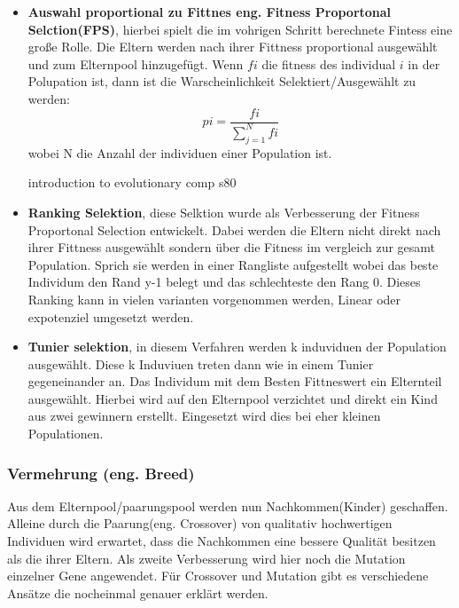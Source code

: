 \begin{itemize}
\item \textbf{Auswahl proportional zu Fittnes eng. Fitness Proportonal Selction(FPS)}, hierbei spielt die im vohrigen Schritt berechnete Fintess eine große Rolle. Die Eltern werden nach ihrer Fittness proportional ausgewählt und zum Elternpool hinzugefügt. Wenn $fi$ die fitness des individual $i$ in der Polupation ist, dann ist die Warscheinlichkeit Selektiert/Ausgewählt zu werden:
\begin{equation}
	pi = \frac{fi}{\sum_{j=1}^N fi}
\end{equation}
wobei N die Anzahl der individuen einer Population ist.

introduction to evolutionary comp s80

\item \textbf{Ranking Selektion}, diese Selktion wurde als Verbesserung der Fitness Proportonal Selection entwickelt. Dabei werden die Eltern nicht direkt nach ihrer Fittness ausgewählt sondern über die Fitness im vergleich zur gesamt Population. Sprich sie werden in einer Rangliste aufgestellt wobei das beste Individum den Rand y-1 belegt und das schlechteste den Rang 0. Dieses Ranking kann in vielen varianten vorgenommen werden, Linear oder expotenziel umgesetzt werden. 

\item \textbf{Tunier selektion}, in diesem Verfahren werden k induviduen der Population ausgewählt. Diese k Induviuen treten dann wie in einem Tunier gegeneinander an. Das Individum mit dem Besten Fittneswert ein Elternteil ausgewählt. Hierbei wird auf den Elternpool verzichtet und direkt ein Kind aus zwei gewinnern erstellt. Eingesetzt wird dies bei eher kleinen Populationen.
\end{itemize}


\subsubsection{Vermehrung (eng. Breed)}
Aus dem Elternpool/paarungspool werden nun Nachkommen(Kinder) geschaffen. Alleine durch die Paarung(eng. Crossover) von qualitativ hochwertigen Individuen wird erwartet, dass die Nachkommen eine bessere Qualität besitzen als die ihrer Eltern. Als zweite Verbesserung wird hier noch die Mutation einzelner Gene angewendet. Für Crossover und Mutation gibt es verschiedene Ansätze die nocheinmal genauer erklärt werden.



